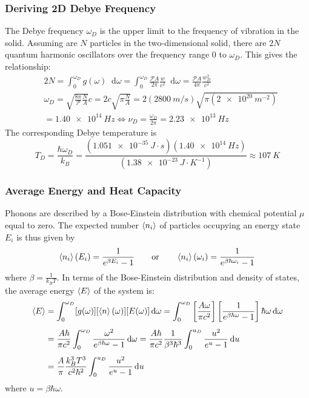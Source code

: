 \documentclass[11pt, a4paper]{article}
\newcommand*\diff{\mathop{}\!\mathrm{d}} %
\begin{document}
\subsubsection*{Deriving 2D Debye Frequency}
The Debye frequency $ \omega_D $ is the upper limit to the frequency of vibration in the solid. Assuming are $ N $ particles in the two-dimensional solid, there are $ 2N $ quantum harmonic oscillators over the frequency range $ 0 $ to $ \omega_D $. This gives the relationship:
\begin{align*}
	&2N = \int_{0}^{\omega_D} g(\omega) \diff \omega = \int_{0}^{\omega_D} \frac{ \mathcal{P} A }{2\pi}  \frac{w}{c^2}  \diff \omega = \frac{ \mathcal{P} A }{4\pi}  \frac{w_D^2}{c^2} \\[1.0ex]
	&\omega_D = \sqrt{\frac{8\pi}{\mathcal{P}} \frac{N}{A}}c = 2c\sqrt{\pi \frac{N }{A}} = 2 \left(\SI{2800}{m/s}\right) \sqrt{\pi \left(\SI{2e20}{m^{-2}}\right)}\\[1.0ex]
	&= \boxed{\SI{1.40e14}{Hz}} \iff \nu_D = \frac{\omega_D}{2\pi} = \boxed{\SI{2.23e13}{Hz}} 
\end{align*}
The corresponding Debye temperature is 
\begin{equation*}
	T_D = \frac{\hbar \omega_D}{k_B} = \frac{(\SI{1.051e-35}{J\cdot s}) ( \SI{1.40e14}{Hz} )}{(\SI{1.38e-23}{J\cdot K^{-1}})} \approx \boxed{\SI{107}{K}}
\end{equation*}
\subsubsection*{Average Energy and Heat Capacity}
Phonons are described by a Bose-Einstein distribution with chemical potential $ \mu $ equal to zero. The expected number $ \expval{n_i} $ of particles occupying an energy state $ E_i $ is thus given by
\begin{equation*}
	\expval{n_i}(E_i) = \frac{1}{e^{\beta E_i} - 1} \qquad \text{or} \qquad \expval{n_i}(\omega_i) = \frac{1}{e^{\beta \hbar \omega_i} - 1}
\end{equation*}
where $ \beta = \frac{1}{k_B T} $. In terms of the Bose-Einstein distribution and density of states, the average energy $ \expval{E} $ of the system is:
\begin{align}
	\expval{E} &= \int_{0}^{\omega_D} [g(\omega)] [\expval{n}(\omega)] [E(\omega)] \diff \omega = \int_{0}^{\omega_D}  \left[ \frac{ A \omega }{\pi c^2} \right] \left[ \frac{1}{e^{\beta \hbar \omega} - 1}\right] \hbar \omega \diff \omega \nonumber \\[1.0ex]
	&= \frac{A\hbar}{\pi c^2} 	\int_{0}^{\omega_D} \frac{\omega^2}{e^{\beta \hbar \omega} - 1} \diff \omega = \frac{A\hbar}{\pi c^2} \frac{1}{\beta^3 \hbar^3}	\int_{0}^{u_D} \frac{u^2}{e^{u} - 1} \diff u \nonumber \\[1.0ex]
	& = \frac{A}{\pi} \frac{k_B^3 T^3}{c^2 \hbar^2}	\int_{0}^{u_D} \frac{u^2}{e^{u} - 1} \diff u \label{eq:avg_energy}
\end{align}
where $ u = \beta \hbar \omega $. 
\end{document}
